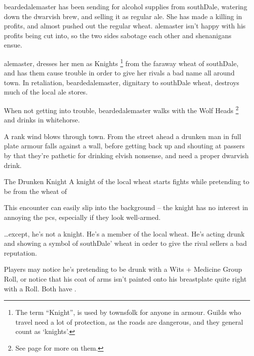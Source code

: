 
\label{troubleAle}

\noindent
\Gls{beardedalemaster} has been sending for alcohol supplies from \gls{southDale}, watering down the dwarvish brew, and selling it as regular ale.
She has made a killing in profits, and almost pushed out the regular \gls{wheat}.
\Gls{alemaster} isn't happy with his profits being cut into, so the two sides sabotage each other and shenanigans ensue.

\Gls{alemaster}, dresses her men as Knights%
\footnote{The term ``Knight'', is used by townsfolk for anyone in armour.
Guilds who travel need a lot of protection, as the roads are dangerous, and they general count as `knights'.}
from the faraway \gls{wheat} of \gls{southDale}, and has them cause trouble in order to give her rivals a bad name all around \gls{town}.
In retaliation, \gls{beardedalemaster}, dignitary to \gls{southDale} \gls{wheat}, destroys much of the local ale stores.

When not getting into trouble, \Gls{beardedalemaster} walks with the Wolf Heads%
\footnote{See page \pageref{beardedalemaster} for more on them.}
and drinks in \gls{whitehorse}.

\begin{boxtext}

  A rank wind blows through \gls{town}.
  From the street ahead a drunken man in full plate armour falls against a wall, before getting back up and shouting at passers by that they're pathetic for drinking elvish nonsense, and need a proper dwarvish drink.

\end{boxtext}

{The Drunken Knight}%
{A knight of the local \gls{wheat} starts fights while pretending to be from the \gls{wheat} of }%

This encounter can easily slip into the background -- the knight has no interest in annoying the \glspl{pc}, especially if they look well-armed.

\ldots except, he's not a knight.
He's a member of the local \gls{wheat}.
He's acting drunk and showing a symbol of \gls{southDale}' \gls{wheat} in order to give the rival sellers a bad reputation.

Players may notice he's pretending to be drunk with a Wits + Medicine Group Roll, or notice that his coat of arms isn't painted onto his breastplate quite right with a  Roll.
Both have \tn[10].

